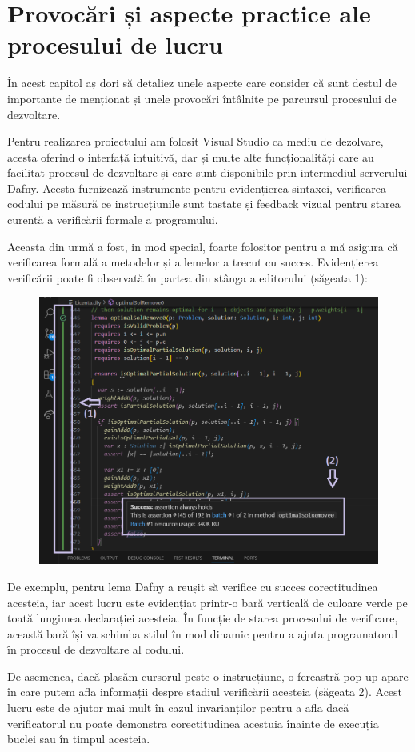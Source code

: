 \chapter{Provocări și aspecte practice ale procesului de lucru}
\begin{sloppypar}

În acest capitol aș dori să detaliez unele aspecte care consider că sunt destul de importante de menționat și unele provocări întâlnite pe parcursul procesului de dezvoltare. \par
Pentru realizarea proiectului am folosit Visual Studio ca mediu de dezolvare, acesta oferind o interfață intuitivă, dar și multe alte funcționalități care au facilitat procesul de dezvoltare și care sunt disponibile prin intermediul serverului Dafny. Acesta furnizează instrumente pentru evidențierea sintaxei, verificarea codului pe măsură ce instrucțiunile sunt tastate și feedback vizual pentru starea curentă a verificării formale a programului. \cite{leino2021dafny} \par
Aceasta din urmă a fost, in mod special, foarte folositor pentru a mă asigura că verificarea formală a metodelor și a lemelor a trecut cu succes. Evidențierea verificării poate fi observată în partea din stânga a editorului (săgeata 1):
\begin{figure}[!ht]
    \centering
    \includegraphics[width=0.6\linewidth]{images/imageVerificationSucceeded.png}
\end{figure}
 \par De exemplu, pentru lema  Dafny a reușit să verifice cu succes corectitudinea acesteia, iar acest lucru este evidențiat printr-o bară verticală de culoare verde pe toată lungimea declarației acesteia. În funcție de starea procesului de verificare, această bară își va schimba stilul în mod dinamic pentru a ajuta programatorul în procesul de dezvoltare al codului.
 \par De asemenea, dacă plasăm cursorul peste o instrucțiune, o fereastră pop-up apare în care putem afla informații despre stadiul verificării acesteia (săgeata 2). Acest lucru este de ajutor mai mult în cazul invarianților pentru a afla dacă verificatorul nu poate demonstra corectitudinea acestuia înainte de execuția buclei sau în timpul acesteia. \par

\end{sloppypar}
